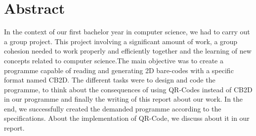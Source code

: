 \newpage

\section{Abstract} 

In the context of our first bachelor year in computer science, we had to carry out a group project. This project involving a significant amount of work, a group cohesion needed to work properly and efficiently together and the learning of new concepts related to computer science.The main objective was to create a programme capable of reading and generating 2D bare-codes with a specific format named CB2D. The different tasks were to design and code the programme, to think about the consequences of using QR-Codes instead of CB2D in our programme and finally the writing of this report about our work. In the end, we successfully created the demanded programme according to the specifications. About the implementation of QR-Code, we discuss about it in our report.

